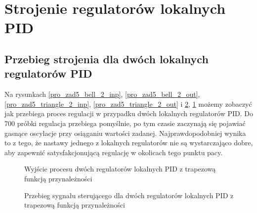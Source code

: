 \section{Strojenie regulatorów lokalnych PID}

\subsection{Przebieg strojenia dla dwóch lokalnych regulatorów PID}
Na rysunkach \ref{pro_zad5_bell_2_inp}, \ref{pro_zad5_bell_2_out}, \ref{pro_zad5_triangle_2_inp}, \ref{pro_zad5_triangle_2_out} i \ref{pro_zad5_trapezoid_2_inp}, \ref{pro_zad5_trapezoid_2_out} możemy zobaczyć jak przebiega proces regulacji w przypadku dwóch lokalnych regulatorów PID. Do 700 próbki regulacja przebiega pomyślnie, po tym czasie zaczynają się pojawiać gasnące oscylacje przy osiąganiu wartości zadanej. Najprawdopodobniej wynika to z tego, że nastawy jednego z lokalnych regulatorów nie są wystarczająco dobre, aby zapewnić satysfakcjonującą regulację w okolicach tego punktu pacy. 
\begin{figure}[b]
    \centering
    \caption{Wyjście procesu dwóch regulatorów lokalnych PID z trapezową funkcją przynależności}
    \label{pro_zad5_trapezoid_2_out}
\end{figure}

\begin{figure}[b]
    \centering
    \caption{Przebieg sygnału sterującego dla dwóch regulatorów lokalnych PID z trapezową funkcją przynależności}
    \label{pro_zad5_trapezoid_2_inp}
\end{figure}


